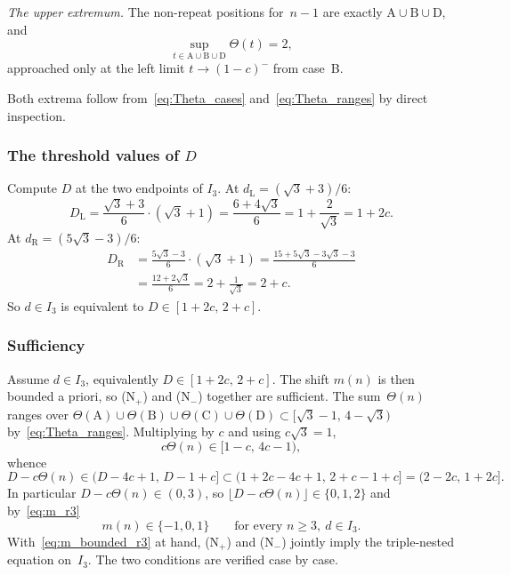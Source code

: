 \documentclass{birkjour}
\theoremstyle{definition}
\theoremstyle{remark}
\newcommand{\fl}[1]{\lfloor #1 \rfloor}
\begin{document}
\emph{The upper extremum.} The non-repeat
positions for~$n-1$ are exactly
$\mathrm{A}\cup\mathrm{B}\cup\mathrm{D}$, and
\begin{equation}\label{eq:upper_extremum}
  \sup_{t\in\mathrm{A}\cup\mathrm{B}\cup\mathrm{D}}\Theta(t)=2,
\end{equation}
approached only at the left limit $t\to(1-c)^{-}$
from case~B.

Both extrema follow from~\eqref{eq:Theta_cases}
and~\eqref{eq:Theta_ranges} by direct inspection.

\subsubsection*{The threshold values of \texorpdfstring{$D$}{D}}

Compute $D$ at the two endpoints of $I_{3}$.
At $d_{\mathrm{L}}=(\sqrt{3}+3)/6$:
\[
  D_{\mathrm{L}}=\frac{\sqrt{3}+3}{6}\cdot(\sqrt{3}+1)
      =\frac{6+4\sqrt{3}}{6}
      =1+\frac{2}{\sqrt{3}}
      =1+2c.
\]
At $d_{\mathrm{R}}=(5\sqrt{3}-3)/6$:
\[
  \begin{aligned}
    D_{\mathrm{R}}&=\frac{5\sqrt{3}-3}{6}\cdot(\sqrt{3}+1)
      =\frac{15+5\sqrt{3}-3\sqrt{3}-3}{6}\\
    &=\frac{12+2\sqrt{3}}{6}
      =2+\frac{1}{\sqrt{3}}
      =2+c.
  \end{aligned}
\]
So $d\in I_{3}$ is equivalent to $D\in[1+2c,\,2+c]$.

\subsubsection*{Sufficiency}

Assume $d\in I_{3}$, equivalently $D\in[1+2c,\,2+c]$.
The shift $m(n)$ is then bounded a priori, so (N$_{+}$) and
(N$_{-}$) together are sufficient. The sum~$\Theta(n)$ ranges over
$\Theta(\mathrm{A})\cup\Theta(\mathrm{B})\cup
\Theta(\mathrm{C})\cup\Theta(\mathrm{D})
\subset[\sqrt{3}-1,\,4-\sqrt{3})$
by~\eqref{eq:Theta_ranges}. Multiplying by $c$ and
using $c\sqrt{3}=1$,
\[
  c\Theta(n)\in[1-c,\,4c-1),
\]
whence
\[
  D-c\Theta(n)\in(D-4c+1,\,D-1+c]
  \subset(1+2c-4c+1,\,2+c-1+c]
  =(2-2c,\,1+2c].
\]
In particular $D-c\Theta(n)\in(0,3)$, so
$\fl{D-c\Theta(n)}\in\{0,1,2\}$ and by~\eqref{eq:m_r3}
\begin{equation}\label{eq:m_bounded_r3}
  m(n)\in\{-1,0,1\}\qquad\text{for every }n\ge 3,
  \ d\in I_{3}.
\end{equation}
With~\eqref{eq:m_bounded_r3} at hand, (N$_{+}$) and
(N$_{-}$) jointly imply the triple-nested equation
on~$I_{3}$. The two conditions are verified case by case.
\end{document}
